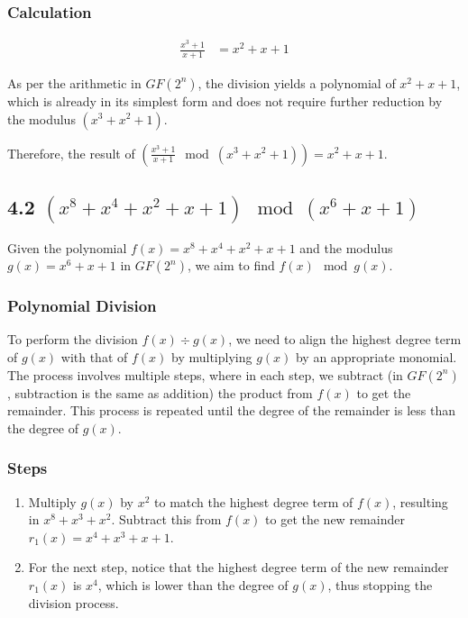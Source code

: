 \documentclass[9pt]{article}
\begin{document}
\begin{CJK*}{UTF8}{gbsn}
\subsubsection*{Calculation}

\begin{align*}
\frac{x^3 + 1}{x + 1} &= x^2 + x + 1
\end{align*}

As per the arithmetic in \(GF(2^n)\), the division yields a polynomial of $x^2 + x + 1$, which is already in its simplest form and does not require further reduction by the modulus $(x^3 + x^2 + 1)$.

Therefore, the result of $(\frac{x^3 + 1}{x + 1} \mod (x^3 + x^2 + 1)) = x^2 + x + 1$.\\

\subsection*{4.2 $(x^8 + x^4 + x^2 + x + 1) \mod (x^6 + x + 1)$}

Given the polynomial $f(x) = x^8 + x^4 + x^2 + x + 1$ and the modulus $g(x) = x^6 + x + 1$ in \(GF(2^n)\), we aim to find $f(x) \mod g(x)$.

\subsubsection*{Polynomial Division}

To perform the division $f(x) \div g(x)$, we need to align the highest degree term of $g(x)$ with that of $f(x)$ by multiplying $g(x)$ by an appropriate monomial. The process involves multiple steps, where in each step, we subtract (in \(GF(2^n)\), subtraction is the same as addition) the product from $f(x)$ to get the remainder. This process is repeated until the degree of the remainder is less than the degree of $g(x)$.

\subsubsection*{Steps}

\begin{enumerate}
    \item Multiply $g(x)$ by $x^2$ to match the highest degree term of $f(x)$, resulting in $x^8 + x^3 + x^2$. Subtract this from $f(x)$ to get the new remainder $r_1(x) = x^4 + x^3 + x + 1$.
    \item For the next step, notice that the highest degree term of the new remainder $r_1(x)$ is $x^4$, which is lower than the degree of $g(x)$, thus stopping the division process.
\end{enumerate}


\end{CJK*}
\end{document}
